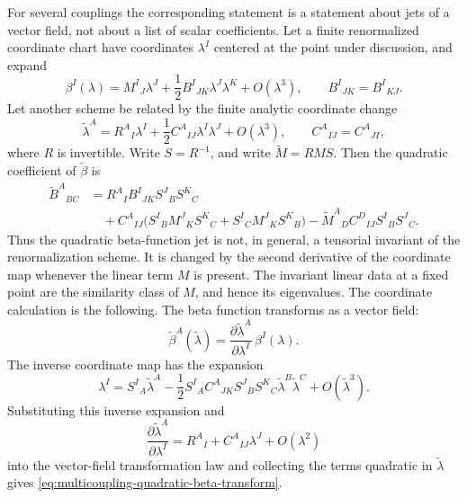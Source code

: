 For several couplings the corresponding statement is a statement about jets of
a vector field, not about a list of scalar coefficients.  Let a finite
renormalized coordinate chart have coordinates \(\lambda^I\) centered at the
point under discussion, and expand
\begin{equation}
  \beta^I(\lambda)
  =
  M^I{}_J\lambda^J
  +
  \frac12 B^I{}_{JK}\lambda^J\lambda^K
  +
  O(\lambda^3),
  \qquad
  B^I{}_{JK}=B^I{}_{KJ}.
  \label{eq:multicoupling-beta-jet}
\end{equation}
Let another scheme be related by the finite analytic coordinate change
\begin{equation}
  \widetilde\lambda^A
  =
  R^A{}_I\lambda^I
  +
  \frac12 C^A{}_{IJ}\lambda^I\lambda^J
  +
  O(\lambda^3),
  \qquad
  C^A{}_{IJ}=C^A{}_{JI},
  \label{eq:multicoupling-coordinate-jet}
\end{equation}
where \(R\) is invertible.  Write \(S=R^{-1}\), and write
\(\widetilde M=RMS\).  Then the quadratic coefficient of
\(\widetilde\beta\) is
\begin{equation}
  \begin{aligned}
  \widetilde B^A{}_{BC}
  &=
  R^A{}_I B^I{}_{JK}S^J{}_B S^K{}_C  \\
  &\quad
  + C^A{}_{IJ}
    \bigl(S^I{}_B M^J{}_K S^K{}_C
          +S^I{}_C M^J{}_K S^K{}_B\bigr)
  - \widetilde M^A{}_D C^D{}_{IJ}S^I{}_B S^J{}_C .
  \end{aligned}
  \label{eq:multicoupling-quadratic-beta-transform}
\end{equation}
Thus the quadratic beta-function jet is not, in general, a tensorial invariant
of the renormalization scheme.  It is changed by the second derivative of the
coordinate map whenever the linear term \(M\) is present.  The invariant
linear data at a fixed point are the similarity class of \(M\), and hence its
eigenvalues.  The coordinate calculation is the following.  The beta function
transforms as a vector field:
\[
  \widetilde\beta^A(\widetilde\lambda)
  =
  \frac{\partial\widetilde\lambda^A}{\partial\lambda^I}
  \,\beta^I(\lambda).
\]
The inverse coordinate map has the expansion
\[
  \lambda^I
  =
  S^I{}_A\widetilde\lambda^A
  -
  \frac12 S^I{}_A C^A{}_{JK}S^J{}_B S^K{}_C
  \widetilde\lambda^B\widetilde\lambda^C
  +
  O(\widetilde\lambda^3).
\]
Substituting this inverse expansion and
\[
  \frac{\partial\widetilde\lambda^A}{\partial\lambda^I}
  =
  R^A{}_I+C^A{}_{IJ}\lambda^J+O(\lambda^2)
\]
into the vector-field transformation law and collecting the terms quadratic in
\(\widetilde\lambda\) gives
\eqref{eq:multicoupling-quadratic-beta-transform}.

